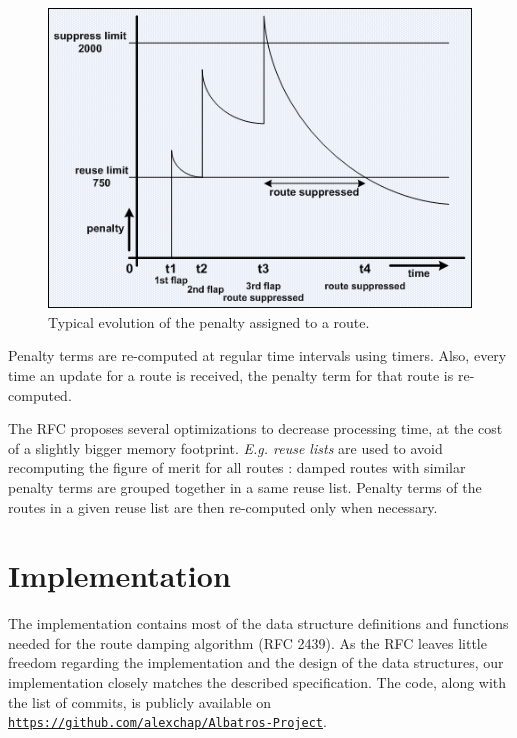 \documentclass[a4paper,english]{IEEEtran}
\begin{document}
\begin{figure}
\begin{center}
\includegraphics[scale=0.5]{route_damping} 
\par\end{center}
\caption{Typical evolution of the penalty assigned to a route.}
\label{fig_penalty}
\end{figure}

Penalty terms are re-computed at regular time intervals using timers.
Also, every time an update for a route is received, the penalty term
for that route is re-computed.

The RFC proposes several optimizations to decrease processing time,
at the cost of a slightly bigger memory footprint. \textit{E.g. reuse
lists} are used to avoid recomputing the figure of merit for all
routes : damped routes with similar penalty terms are grouped together
in a same reuse list. Penalty terms of the routes in a given reuse
list are then re-computed only when necessary.


\section{Implementation}

The implementation contains most of the data structure definitions
and functions needed for the route damping algorithm (RFC 2439).
As the RFC leaves little freedom regarding the implementation and the 
design of the data structures, our implementation closely matches the 
described specification.
The code, along with the list of commits, is publicly available on
{\tt\small \href{https://github.com/alexchap/Albatros-Project}
{https://github.com/alexchap/Albatros-Project}}.
\end{document}

